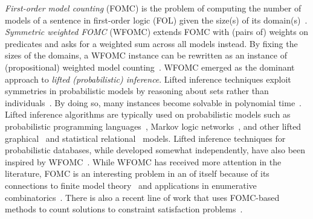 \documentclass{article}
\theoremstyle{definition}
\begin{document}
\emph{First-order model counting} (FOMC) is the problem of computing the number
of models of a sentence in first-order logic (FOL) given the size(s) of its
domain(s)~\cite{DBLP:conf/pods/BeameBGS15}. \emph{Symmetric weighted FOMC}
(WFOMC) extends FOMC with (pairs of) weights on predicates and asks for a
weighted sum across all models instead. By fixing the sizes of the domains, a
WFOMC instance can be rewritten as an instance of (propositional) weighted model
counting~\cite{DBLP:journals/ai/ChaviraD08}. WFOMC emerged as the dominant
approach to \emph{lifted (probabilistic) inference}. Lifted inference techniques
exploit symmetries in probabilistic models by reasoning about sets rather than
individuals~\cite{DBLP:conf/ecai/Kersting12}. By doing so, many instances become
solvable in polynomial time~\cite{DBLP:conf/nips/Broeck11}. Lifted inference
algorithms are typically used on probabilistic models such as probabilistic
programming
languages~\cite{DBLP:journals/ml/RaedtK15,DBLP:journals/ijar/RiguzziBZCL17},
Markov logic
networks~\cite{DBLP:conf/ijcai/BroeckTMDR11,DBLP:journals/cacm/GogateD16,DBLP:journals/ml/RichardsonD06},
and other lifted graphical~\cite{DBLP:journals/ml/KimmigMG15} and statistical
relational~\cite{DBLP:series/synthesis/2016Raedt} models. Lifted inference
techniques for probabilistic databases, while developed somewhat independently,
have also been inspired by
WFOMC~\cite{DBLP:journals/pvldb/GatterbauerS15,DBLP:journals/debu/GribkoffSB14}.
While WFOMC has received more attention in the literature, FOMC is an
interesting problem in an of itself because of its connections to finite model
theory~\cite{DBLP:conf/kr/BremenK21} and applications in enumerative
combinatorics~\cite{DBLP:conf/ilp/BarvinekB0ZK21}. There is also a recent line
of work that uses FOMC-based methods to count solutions to constraint
satisfaction problems~\cite{DBLP:journals/jair/TotisDRK23}.

\end{document}
